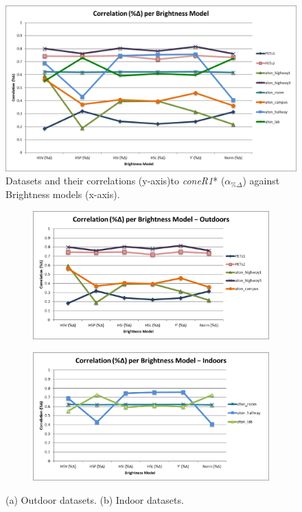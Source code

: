 \begin{figure}
  \includegraphics[width=\linewidth]{figures/correlation_x_rgb.jpg}
  \caption{Datasets and their correlations (y-axis)to \textit{coneR1}* ($\alpha_{\%\Delta}$) against Brightness models (x-axis).}
\label{fig:brightness_corr_rgb}
\end{figure}

\begin{figure}
\centering
\begin{subfigure}{.8\linewidth}
  \includegraphics[width=1\linewidth]{figures/correlation_outdoors_rgb.jpg}
  \caption{}
\end{subfigure}
\hfill
\begin{subfigure}{.8\linewidth}
  \includegraphics[width=1\linewidth]{figures/correlation_indoors_rgb.jpg}
  \caption{}
\end{subfigure}

\caption{(a) Outdoor datasets. (b) Indoor datasets.}
\label{fig:brightness_indoor_outdoor_rgb}
\end{figure}


